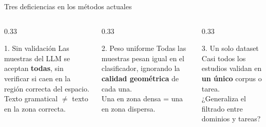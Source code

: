 \begin{frame}{Tres deficiencias en los métodos actuales}
\small
\begin{columns}[T]

\begin{column}{0.33\textwidth}
\begin{block}{1. Sin validación}
Las muestras del LLM se aceptan \textbf{todas}, sin verificar si caen en la región correcta del espacio.
\vspace{0.3em}\\
{\scriptsize Texto gramatical $\neq$ texto en la zona correcta.}
\end{block}
\end{column}

\begin{column}{0.33\textwidth}
\begin{block}{2. Peso uniforme}
Todas las muestras pesan igual en el clasificador, ignorando la \textbf{calidad geométrica} de cada una.
\vspace{0.3em}\\
{\scriptsize Una en zona densa = una en zona dispersa.}
\end{block}
\end{column}

\begin{column}{0.33\textwidth}
\begin{block}{3. Un solo dataset}
Casi todos los estudios validan en \textbf{un único} corpus o tarea.
\vspace{0.3em}\\
{\scriptsize ¿Generaliza el filtrado entre dominios y tareas?}
\end{block}
\end{column}

\end{columns}

\vfill
{}

\end{frame}

